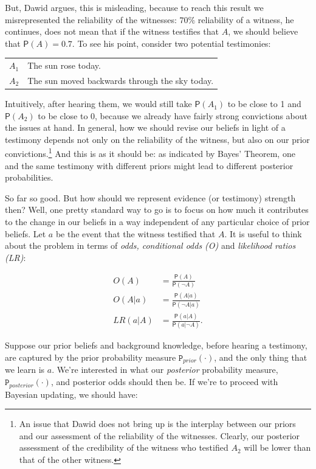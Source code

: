 \documentclass[10pt,dvipsnames,enabledeprecatedfontcommands]{scrartcl}
\newcommand{\n}{\neg}
\newcommand{\pr}[1]{\mathsf{P}(#1)}
\newcommand{\prr}[1]{\mbox{$\mathtt{P}_{prior}(#1)$}}
\newcommand{\prp}[1]{\mbox{$\mathtt{P}_{posterior}(#1)$}}
\begin{document}
But, Dawid argues, this is misleading, because to reach this result we
misrepresented the reliability of the witnesses: \(70\%\) reliability of
a witness, he continues, does not mean that if the witness testifies
that \(A\), we should believe that \(\pr{A}=0.7\). To see his point,
consider two potential testimonies:

\begin{center}
\begin{tabular}
{@{}ll@{}}
\toprule
  $A_1$ & The sun rose today. \\
   $A_2$ & The sun moved backwards through the sky today.\\
\bottomrule
\end{tabular}
\end{center}

\noindent     Intuitively, after hearing them, we would still take
\(\pr{A_1}\) to be close to 1 and \(\pr{A_2}\) to be close to 0, because
we already have fairly strong convictions about the issues at hand. In
general, how we should revise our beliefs in light of a testimony
depends not only on the reliability of the witness, but also on our
prior
convictions.\footnote{An issue that Dawid does not bring up is the interplay between our priors and our assessment of the reliability of the witnesses. Clearly, our posterior assessment of the credibility of the witness who testified $A_2$ will be lower than that of the other witness.}
And this is as it should be: as indicated by Bayes' Theorem, one and the
same testimony with different priors might lead to different posterior
probabilities.

So far so good. But how should we represent evidence (or testimony)
strength then? Well, one pretty standard way to go is to focus on how
much it contributes to the change in our beliefs in a way independent of
any particular choice of prior beliefs. Let \(a\) be the event that the
witness testified that \(A\). It is useful to think about the problem in
terms of \emph{odds, conditional odds (O)} and
\emph{likelihood ratios (LR)}:

\begin{align*} O(A)  & = \frac{\pr{A}}{\pr{\n A}}\\
 O(A\vert a) &= \frac{\pr{A\vert a}}{\pr{\n A \vert a}}  \\
 LR(a\vert A) &= \frac{\pr{a\vert A}}{\pr{a\vert \n A}}. 
\end{align*}

Suppose our prior beliefs and background knowledge, before hearing a
testimony, are captured by the prior probability measure
\(\prr{\cdot}\), and the only thing that we learn is \(a\). We're
interested in what our \emph{posterior} probability measure,
\(\prp{\cdot}\), and posterior odds should then be. If we're to proceed
with Bayesian updating, we should have:
\end{document}
